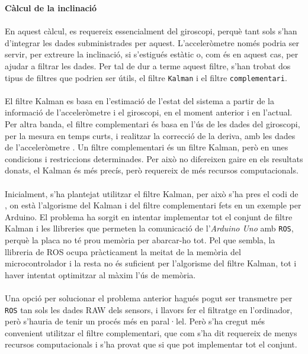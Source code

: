 \documentclass[12pt,a4paper,final,twoside]{article}
\begin{document}
\vspace{20pt}
\textbf{Càlcul de la inclinació}

\paragraph{}En aquest càlcul, es requereix essencialment del giroscopi, perquè tant sols s'han d'integrar les dades subministrades per aquest. L'acceleròmetre només podria ser servir, per extreure la inclinació, si s'estigués estàtic o, com és en aquest cas, per ajudar a filtrar les dades. Per tal de dur a terme aquest filtre, s'han trobat dos tipus de filtres que podrien ser útils, el filtre \texttt{Kalman} i el filtre \texttt{complementari}.

\paragraph{}El filtre Kalman es basa en l'estimació de l'estat del sistema a partir de la informació de l'acceleròmetre i el giroscopi, en el moment anterior i en l'actual. Per altra banda, el filtre complementari és basa en l'ús de les dades del giroscopi, per la mesura en temps curts, i realitzar la correcció de la deriva, amb les dades de l'acceleròmetre \cite{Gaydou2011}. Un filtre complementari és un filtre Kalman, però en unes condicions i restriccions determinades. Per això no difereixen gaire en els resultats donats, el Kalman és més precís, però requereix de més recursos computacionals.

\paragraph{}Inicialment, s'ha plantejat utilitzar el filtre Kalman, per això s'ha pres el codi de \cite{Lauszus2012}, on està l'algorisme del Kalman i del filtre complementari fets en un exemple per Arduino. El problema ha sorgit en intentar implementar tot el conjunt de filtre Kalman i les llibreries que permeten la comunicació de l'\textit{Arduino Uno} amb \texttt{ROS}, perquè la placa no té prou memòria per abarcar-ho tot. Pel que sembla, la llibreria de ROS ocupa pràcticament la meitat de la memòria del microcontrolador i la resta no és suficient per l'algorisme del filtre Kalman, tot i haver intentat optimitzar al màxim l'ús de memòria.

\paragraph{}Una opció per solucionar el problema anterior hagués pogut ser transmetre per \texttt{ROS} tan sols les dades RAW dels sensors, i llavors fer el filtratge en l'ordinador, però s'hauria de tenir un procés més en paral·lel. Però s'ha cregut més convenient utilitzar el filtre complementari, que com s'ha dit requereix de menys recursos computacionals i s'ha provat que si que pot implementar tot el conjunt.
\end{document}
